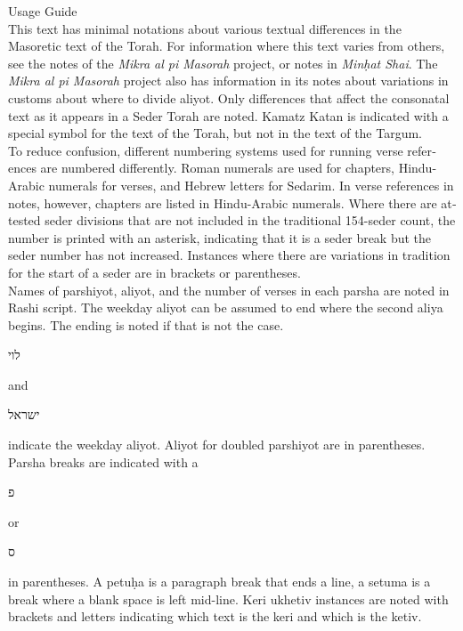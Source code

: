 \clearpage
{}	
\begin{minipage}{\textwidth}\englishfont
	
	\begin{english}
		\vspace{16pt}
		\Large Usage Guide\vspace{12pt}\\
		\normalsize
		This text has minimal notations about various textual differences in the Masoretic text of the Torah. For information where this text varies from others, see the notes of the \textit{Mikra al pi Masorah} project, or notes in \textit{Min\d{h}at Shai}. The \textit{Mikra al pi Masorah} project also has information in its notes about variations in customs about where to divide aliyot. Only differences that affect the consonatal text as it appears in a Seder Torah are noted. Kamatz Katan is indicated with a special symbol for the text of the Torah, but not in the text of the Targum.\\
		
		To reduce confusion, different numbering systems used for running verse references are numbered differently. Roman numerals are used for chapters, Hindu-Arabic numerals for verses, and Hebrew letters for Sedarim. In verse references in notes, however, chapters are listed in Hindu-Arabic numerals. Where there are attested seder divisions that are not included in the traditional 154-seder count, the number is printed with an asterisk, indicating that it is a seder break but the seder number has not increased. Instances where there are variations in tradition for the start of a seder are in brackets or parentheses.\\
		
		Names of parshiyot, aliyot, and the number of verses in each parsha are noted in Rashi script. The weekday aliyot can be assumed to end where the second aliya begins. The ending is noted if that is not the case.   \begin{hebrew}\footnotesize לוי \normalsize\end{hebrew} and  \begin{hebrew}\footnotesize ישראל\normalsize\end{hebrew} indicate the weekday aliyot. Aliyot for doubled parshiyot are in parentheses.\\
		
		Parsha breaks are indicated with a \begin{hebrew}\footnotesize פ\normalsize \end{hebrew} or \begin{hebrew}ס\end{hebrew} in parentheses. A petu\d{h}a is a paragraph break that ends a line, a setuma is a break where a blank space is left mid-line. Keri ukhetiv instances are noted with brackets and letters indicating which text is the keri and which is the ketiv.\\
		

\end{english}
\end{minipage}
